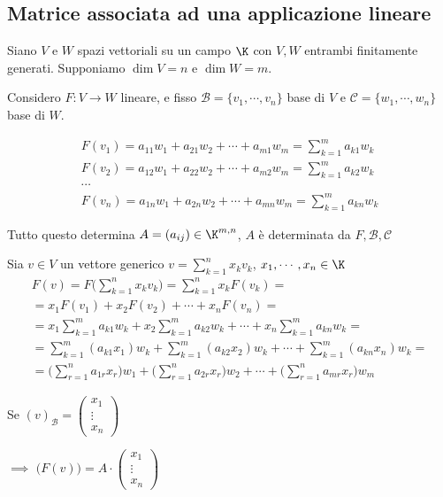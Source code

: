 \subsection{Matrice associata ad una applicazione lineare}

Siano $ V $ e $ W $ spazi vettoriali su un campo $ \K $ con $ V,W $ entrambi finitamente generati. Supponiamo $ \dim V =n$ e $ \dim W = m$.

Considero $ F:V\to W $ lineare, e fisso $ \mathscr{B}=\{v_{1}, \cdots, v_{n}  \} $ base di $ V $ e $ \mathscr{C}=\{w_{1}, \cdots, w_{n}  \} $ base di $ W $.

\begin{gather*}
F(v_{1} ) = a_{11} w_{1} + a_{21} w_2+ \cdots + a_{m1} w_{m}=\sum_{k=1}^m a_{k1} w_{k}   \\
F(v_{2} ) = a_{12} w_{1} + a_{22} w_2+ \cdots + a_{m2} w_{m}=\sum_{k=1}^m a_{k2} w_{k}\\
\cdots\\
F(v_{n} ) = a_{1n} w_{1} + a_{2n} w_2+ \cdots + a_{mn} w_{m}=\sum_{k=1}^m a_{kn} w_{k}
\end{gather*}

Tutto questo determina $ A=(a_{ij} ) \in \K^{m,n}$, $ A $ è determinata da $ F, \mathscr{B}, \mathscr{C} $

Sia $ v \in V $ un vettore generico $ v= \sum_{k=1}^n x_{k}v_{k}$, $ x_1, \cdots, x_{n} \in \K  $
\begin{multline*}
	F(v)=F\bigg(\sum_{k=1}^n x_{k}v_{k}\bigg)=\sum_{k=1}^n x_{k}F(v_{k})=\\
	=x_1F(v_1)+x_2F(v_2)+ \cdots + x_{n}F(v_{n} ) =\\
	=x_1\sum_{k=1}^m a_{k1} w_{k}+x_2\sum_{k=1}^m a_{k2} w_{k}+ \cdots + x_{n}\sum_{k=1}^m a_{kn} w_{k}=\\
	=\sum_{k=1}^m (a_{k1} x_1) w_{k}+\sum_{k=1}^m (a_{k2} x_2) w_{k}+ \cdots + \sum_{k=1}^m (a_{kn} x_{n})  w_{k}=\\
	=\bigg(\sum_{r=1}^n a_{1r} x_{r}  \bigg) w_1+\bigg(\sum_{r=1}^n a_{2r} x_{r}  \bigg) w_2 + \cdots + \bigg(\sum_{r=1}^n a_{mr} x_{r}  \bigg) w_m
\end{multline*}

Se $ (v)_{\mathscr{B}}=\begin{pmatrix}
	x_1\\
	\vdots\\
	x_{n} 
\end{pmatrix} $ 

$\implies$ $ \big(F(v)\big)=A\cdot \begin{pmatrix}
	x_1\\
	\vdots\\
	x_{n} 
\end{pmatrix} $ 

